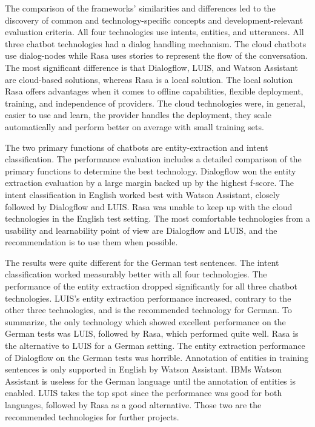 The comparison of the frameworks' similarities and differences led to the discovery of common and technology-specific concepts and development-relevant evaluation criteria.
All four technologies use intents, entities, and utterances.
All three chatbot technologies had a dialog handling mechanism.
The cloud chatbots use dialog-nodes while Rasa uses stories to represent 
the flow of the conversation.
The most significant difference is that Dialogflow, LUIS, and Watson Assistant are cloud-based solutions, whereas Rasa is a local solution.
The local solution Rasa offers advantages when it comes to offline capabilities, flexible deployment, training, and independence of providers.
The cloud technologies were, in general, easier to use and learn, the provider handles the deployment, they scale automatically and perform better on average with small training sets. 

The two primary functions of chatbots are entity-extraction and intent classification.
The performance evaluation includes a detailed comparison of the primary functions to determine the best technology.
Dialogflow won the entity extraction evaluation by a large margin backed up by the highest f-score.
The intent classification in English worked best with Watson Assistant, closely followed by Dialogflow and LUIS.
Rasa was unable to keep up with the cloud technologies in the English test setting.
The most comfortable technologies from a usability and learnability point of view are Dialogflow and LUIS, and the recommendation is to use them when possible.

The results were quite different for the German test sentences.
The intent classification worked measurably better with all four technologies.
The performance of the entity extraction dropped significantly for all three chatbot technologies.
LUIS's entity extraction performance increased, contrary to the other three technologies, and is the recommended technology for German.
To summarize, the only technology which showed excellent performance on the German tests was LUIS, followed by Rasa, which performed quite well.
Rasa is the alternative to LUIS for a German setting.
The entity extraction performance of Dialogflow on the German tests was horrible.
Annotation of entities in training sentences is only supported in English by Watson Assistant.
IBMs Watson Assistant is useless for the German language until the annotation of entities is enabled.
LUIS takes the top spot since the performance was good for both languages, followed by Rasa as a good alternative.
Those two are the recommended technologies for further projects.